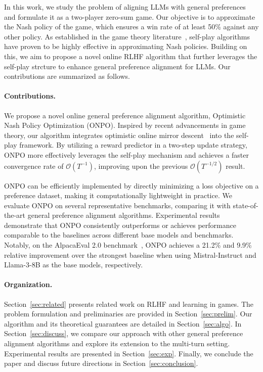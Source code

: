 In this work, we study the problem of aligning LLMs with general preferences and formulate it as a two-player zero-sum game. Our objective is to approximate the Nash policy of the game, which ensures a win rate of at least 50\% against any other policy. As established in the game theory literature~\citep{bai2020near,liu2021sharp}, self-play algorithms have proven to be highly effective in approximating Nash policies. Building on this, we aim to propose a novel online RLHF algorithm that further leverages the self-play strcture to enhance general preference alignment for LLMs. Our contributions are summarized as follows.

\paragraph{Contributions.} We propose a novel online general preference alignment algorithm, Optimistic Nash Policy Optimization (ONPO). Inspired by recent advancements in game theory, our algorithm integrates optimistic online mirror descent~\citep{rakhlin2013optimization,syrgkanis2015fast} into the self-play framework. By utilizing a reward predictor in a two-step update strategy, ONPO more effectively leverages the self-play mechanism and achieves a faster convergence rate of $\mathcal{O}(T^{-1})$, improving upon the previous $\mathcal{O}(T^{-1/2})$ result.  

ONPO can be efficiently implemented by directly minimizing a loss objective on a preference dataset, making it computationally lightweight in practice. We evaluate ONPO on several representative benchmarks, comparing it with state-of-the-art general preference alignment algorithms. Experimental results demonstrate that ONPO consistently outperforms or achieves performance comparable to the baselines across different base models and benchmarks. Notably, on the AlpacaEval 2.0 benchmark~\citep{li2023alpacaeval}, ONPO achieves a 21.2\% and 9.9\% relative improvement over the strongest baseline when using Mistral-Instruct and Llama-3-8B as the base models, respectively.

\paragraph{Organization.} Section~\ref{sec:related} presents related work on RLHF and learning in games. The problem formulation and preliminaries are provided in Section~\ref{sec:prelim}. Our algorithm and its theoretical guarantees are detailed in Section~\ref{sec:algo}. In Section~\ref{sec:discuss}, we compare our approach with other general preference alignment algorithms and explore its extension to the multi-turn setting. Experimental results are presented in Section~\ref{sec:exp}. Finally, we conclude the paper and discuss future directions in Section~\ref{sec:conclusion}.
